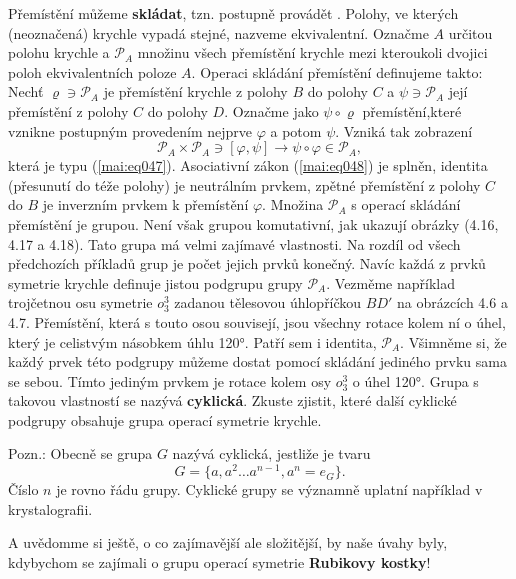 \begin{mdframed}[style=mdexam]
\begin{example}
      Přemístění můžeme \textbf{skládat}, tzn. postupně provádět . Polohy, ve kterých (neoznačená)
      krychle vypadá stejné, nazveme ekvivalentní. Označme \(A\) určitou polohu krychle a
      \(\mathcal{P}_A\) množinu všech přemístění krychle mezi kteroukoli dvojici poloh
      ekvivalentních poloze \(A\). Operaci skládání přemístění definujeme takto: Nechť
      \(\varrho\ni\mathcal{P}_A\) je přemístění krychle z polohy \(B\) do polohy \(C\) a
      \(\psi\ni\mathcal{P}_A\) její přemístění z polohy \(C\) do polohy \(D\). Označme jako
      \(\psi\circ\varrho\) přemístění,které vznikne postupným provedením nejprve \(\varphi\) a potom
      \(\psi\). Vzniká tak zobrazení
      \begin{equation*}
        \mathcal{P}_A\times\mathcal{P}_A\ni [\varphi,\psi] 
          \longrightarrow\psi\circ\varphi\in\mathcal{P}_A,
      \end{equation*}
      která je typu (\ref{mai:eq047}). Asociativní zákon (\ref{mai:eq048}) je splněn, identita
      (přesunutí do téže polohy) je neutrálním prvkem, zpětné přemístění z polohy \(C\) do \(B\) je
      inverzním prvkem k přemístění \(\varphi\). Množina \(\mathcal{P}_A\) s operací skládání
      přemístění je grupou. Není však grupou komutativní, jak ukazují obrázky (4.16, 4.17 a 4.18).
      Tato grupa má velmi zajímavé vlastnosti. Na rozdíl od všech předchozích příkladů grup je počet
      jejich prvků konečný. Navíc každá z prvků symetrie krychle definuje jistou podgrupu grupy
      \(\mathcal{P}_A\). Vezměme například trojčetnou osu symetrie \(o_3^3\) zadanou tělesovou
      úhlopříčkou \(BD'\) na obrázcích 4.6 a 4.7. Přemístění, která s touto osou souvisejí, jsou
      všechny rotace kolem ní o úhel, který je celistvým násobkem úhlu \ang{120}. Patří sem i
      identita, \(\mathcal{P}_A\). Všimněme si, že každý prvek této podgrupy můžeme dostat pomocí
      skládání jediného prvku sama se sebou. Tímto jediným prvkem je rotace kolem osy \(o_3^3\) o
      úhel \ang{120}. Grupa s takovou vlastností se nazývá \textbf{cyklická}. Zkuste zjistit, které
      další cyklické podgrupy obsahuje grupa operací symetrie krychle. 
      
      Pozn.: Obecně se grupa \(G\) nazývá cyklická, jestliže je tvaru
      \begin{equation*}
        G = \{a, a^2 \ldots a^{n-1}, a^n = e_G\}.
      \end{equation*}
      Číslo \(n\) je rovno řádu grupy. Cyklické grupy se významně uplatní například v
      krystalografii.
      
      A uvědomme si ještě, o co zajímavější ale složitější, by naše úvahy byly, kdybychom se
      zajímali o grupu operací symetrie\textbf{ Rubikovy kostky}! 
  \end{example}
\end{mdframed}
